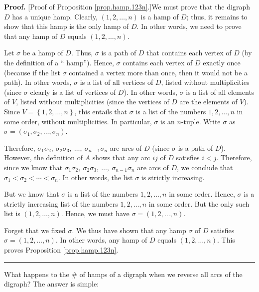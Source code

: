 \documentclass[numbers=enddot,12pt,final,onecolumn,notitlepage]{scrartcl}%
\numberwithin{exer}{subsection}
\theoremstyle{definition}
\newenvironment{proof}[1][Proof]{\noindent\textbf{#1.} }{\ \rule{0.5em}{0.5em}}
\begin{document}
\begin{proof}
[Proof of Proposition \ref{prop.hamp.123n}.]We must prove that the digraph $D$
has a unique hamp. Clearly, $\left(  1,2,\ldots,n\right)  $ is a hamp of $D$;
thus, it remains to show that this hamp is the only hamp of $D$. In other
words, we need to prove that any hamp of $D$ equals $\left(  1,2,\ldots
,n\right)  $.

Let $\sigma$ be a hamp of $D$. Thus, $\sigma$ is a path of $D$ that contains
each vertex of $D$ (by the definition of a \textquotedblleft
hamp\textquotedblright). Hence, $\sigma$ contains each vertex of $D$ exactly
once (because if the list $\sigma$ contained a vertex more than once, then it
would not be a path). In other words, $\sigma$ is a list of all vertices of
$D$, listed without multiplicities (since $\sigma$ clearly is a list of
vertices of $D$). In other words, $\sigma$ is a list of all elements of $V$,
listed without multiplicities (since the vertices of $D$ are the elements of
$V$). Since $V=\left\{  1,2,\ldots,n\right\}  $, this entails that $\sigma$ is
a list of the numbers $1,2,\ldots,n$ in some order, without multiplicities. In
particular, $\sigma$ is an $n$-tuple. Write $\sigma$ as $\sigma=\left(
\sigma_{1},\sigma_{2},\ldots,\sigma_{n}\right)  $.

Therefore, $\sigma_{1}\sigma_{2},\ \sigma_{2}\sigma_{3},\ \ldots
,\ \sigma_{n-1}\sigma_{n}$ are arcs of $D$ (since $\sigma$ is a path of $D$).
However, the definition of $A$ shows that any arc $ij$ of $D$ satisfies $i<j$.
Therefore, since we know that $\sigma_{1}\sigma_{2},\ \sigma_{2}\sigma
_{3},\ \ldots,\ \sigma_{n-1}\sigma_{n}$ are arcs of $D$, we conclude that
$\sigma_{1}<\sigma_{2}<\cdots<\sigma_{n}$. In other words, the list $\sigma$
is strictly increasing.

But we know that $\sigma$ is a list of the numbers $1,2,\ldots,n$ in some
order. Hence, $\sigma$ is a strictly increasing list of the numbers
$1,2,\ldots,n$ in some order. But the only such list is $\left(
1,2,\ldots,n\right)  $. Hence, we must have $\sigma=\left(  1,2,\ldots
,n\right)  $.

Forget that we fixed $\sigma$. We thus have shown that any hamp $\sigma$ of
$D$ satisfies $\sigma=\left(  1,2,\ldots,n\right)  $. In other words, any hamp
of $D$ equals $\left(  1,2,\ldots,n\right)  $. This proves Proposition
\ref{prop.hamp.123n}.
\end{proof}

What happens to the $\#$ of hamps of a digraph when we reverse all arcs of the
digraph? The answer is simple:
\end{document}
